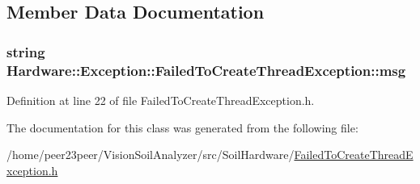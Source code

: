 \subsection{Member Data Documentation}
\hypertarget{class_hardware_1_1_exception_1_1_failed_to_create_thread_exception_a095cd7250c0a527623cf993c991572a8}{}
\subsubsection[{msg}]{\setlength{\rightskip}{0pt plus 5cm}string Hardware\+::\+Exception\+::\+Failed\+To\+Create\+Thread\+Exception\+::msg\hspace{0.3cm}{\ttfamily [private]}}\label{class_hardware_1_1_exception_1_1_failed_to_create_thread_exception_a095cd7250c0a527623cf993c991572a8}


Definition at line 22 of file Failed\+To\+Create\+Thread\+Exception.\+h.



The documentation for this class was generated from the following file\+:\begin{DoxyCompactItemize}
\item 
/home/peer23peer/\+Vision\+Soil\+Analyzer/src/\+Soil\+Hardware/\hyperlink{_failed_to_create_thread_exception_8h}{Failed\+To\+Create\+Thread\+Exception.\+h}\end{DoxyCompactItemize}
